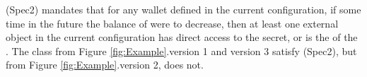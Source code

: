 \documentclass[acmsmall,screen]{acmart}
\begin{document}
 
 (Spec2) mandates that for any wallet  defined in the current configuration, if some time in the future the balance of
 were to decrease, then at least one external object   in the current configuration
has direct access to the secret, or is the  of the . 
The class  from Figure \ref{fig:Example}.version 1 and version 3 satisfy (Spec2), but  from Figure \ref{fig:Example}.version 2, does not.

%
%
% 
%
%
\end{document}
